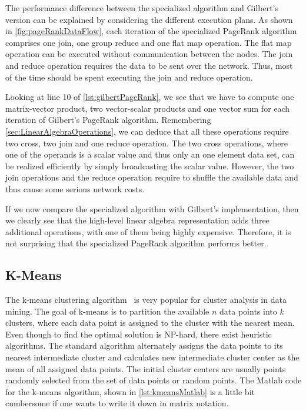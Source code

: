 The performance difference between the specialized algorithm and Gilbert's version can be explained by considering the different execution plans.
As shown in \cref{fig:pageRankDataFlow}, each iteration of the specialized PageRank algorithm comprises one join, one group reduce and one flat map operation.
The flat map operation can be executed without communication between the nodes.
The join and reduce operation requires the data to be sent over the network.
Thus, most of the time should be spent executing the join and reduce operation.

Looking at line 10 of \cref{lst:gilbertPageRank}, we see that we have to compute one matrix-vector product, two vector-scalar products and one vector sum for each iteration of Gilbert's PageRank algorithm.
Remembering \cref{sec:LinearAlgebraOperations}, we can deduce that all these operations require two cross, two join and one reduce operation.
The two cross operations, where one of the operands is a scalar value and thus only an one element data set, can be realized efficiently by simply broadcasting the scalar value.
However, the two join operations and the reduce operation require to shuffle the available data and thus cause some serious network costs.

If we now compare the specialized algorithm with Gilbert's implementation, then we clearly see that the high-level linear algebra representation adds three additional operations, with one of them being highly expensive.
Therefore, it is not surprising that the specialized PageRank algorithm performs better.

\subsection{K-Means}

The k-means clustering algorithm~\cite{macqueen:1967a} is very popular for cluster analysis in data mining.
The goal of k-means is to partition the available $n$ data points into $k$ clusters, where each data point is assigned to the cluster with the nearest mean.
Even though to find the optimal solution is NP-hard, there exist heuristic algorithms.
The standard algorithm alternately assigns the data points to its nearest intermediate cluster and calculates new intermediate cluster center as the mean of all assigned data points.
The initial cluster centers are usually points randomly selected from the set of data points or random points.
The Matlab code for the k-means algorithm, shown in \cref{lst:kmeansMatlab} is a little bit cumbersome if one wants to write it down in matrix notation.

